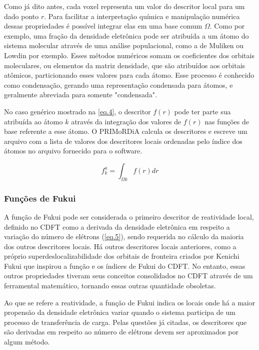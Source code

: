 \documentclass[a4paper,11pt]{refart}
\begin{document}
Como já dito antes, cada voxel representa um valor do descritor local para um dado ponto $r$. Para facilitar a interpretação química e manipulação numérica dessas propriedades é possível integrar elas em uma base comum $\Omega$. Como por exemplo, uma fração da densidade eletrônica pode ser atribuída a um átomo do sistema molecular através de uma análise populacional, como a de Muliken ou Lowdin por exemplo. Esses métodos numéricos somam os coeficientes dos orbitais moleculares, ou elementos da matriz densidade, que são atribuídos aos orbitais atômicos, particionando esses valores para cada átomo. Esse processo é conhecido como condensação, gerando uma representação condensada para átomos, e geralmente abreviada para somente "condensada". 

No caso genérico mostrado na \autoref{eq.4}, o descritor $f(r)$ pode ter parte sua atribuída ao átomo $k$ através da integração dos valores de $f(r)$ nas funções de base referente a esse átomo. O PRIMoRDiA calcula os descritores e escreve um arquivo com a lista de valores dos descritores locais ordenadas pelo índice dos átomos no arquivo fornecido para o software. 

\begin{equation}
f_k^{a} = \int_{\Omega k} f(r)dr
\label{eq.4}
\end{equation} 

\subsubsection{Funções de Fukui} 

A função de Fukui pode ser considerada o primeiro descritor de reatividade local, definido no CDFT como a derivada da densidade eletrônica em respeito a variação do número de elétrons (\autoref{eq.5}), sendo requerida no cálculo da maioria dos outros descritores locais. Há outros descritores locais anteriores, como a próprio superdeslocalizabilidade dos orbitais de fronteira criados por Kenichi Fukui que inspirou a função e os índices de Fukui do CDFT\cite{fukui1970theory}. No entanto, essas outros propriedades tiveram seus conceitos consolidados no CDFT através de um ferramental matemático, tornando essas outras quantidade obsoletas.  

Ao que se refere a reatividade, a função de Fukui indica os locais onde há a maior propensão da densidade eletrônica variar quando o sistema participa de um processo de transferência de carga. Pelas questões já citadas, os descritores que são derivadas em respeito ao número de elétrons devem ser aproximados por algum método. 
\end{document}
